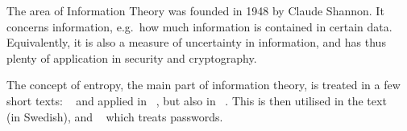 The area of Information Theory was founded in 1948 by Claude Shannon.
It concerns information, e.g.\ how much information is contained in certain 
data.
Equivalently, it is also a measure of uncertainty in information, and has thus 
plenty of application in security and cryptography.

The concept of entropy, the main part of information theory, is treated in 
a few short texts: ~\cite{Eckersley2010apo} and 
applied in ~\cite{Eckersley2010hui}, but also in 
~\cite{Ueltschi2013se}.
This is then utilised in the text ~\cite{Bosk2013gl} (in 
Swedish), and ~\cite{Komanduri2011opa} which treats 
passwords.
